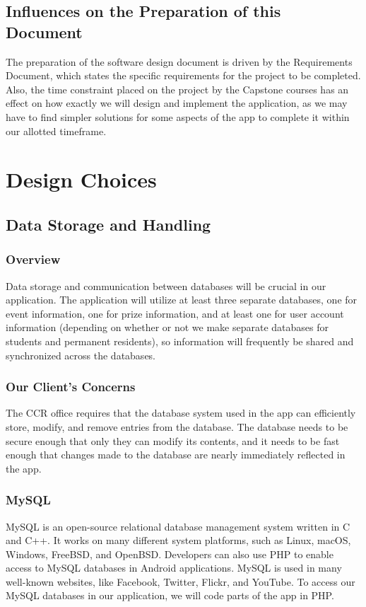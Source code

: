 \documentclass[draftclsnofoot, onecolumn, 10pt, compsoc]{IEEEtran}
\begin{document}
		\subsection{Influences on the Preparation of this Document}
			The preparation of the software design document is driven by the Requirements Document, which states the specific requirements for the project to be completed. Also, the time constraint placed on the project by the Capstone courses has an effect on how exactly we will design and implement the application, as we may have to find simpler solutions for some aspects of the app to complete it within our allotted timeframe.

	\section{Design Choices}
		\subsection{Data Storage and Handling}
			\subsubsection{Overview}
				Data storage and communication between databases will be crucial in our application. The application will utilize at least three separate databases, one for event information, one for prize information, and at least one for user account information (depending on whether or not we make separate databases for students and permanent residents), so information will frequently be shared and synchronized across the databases.
			\subsubsection{Our Client's Concerns}
				The CCR office requires that the database system used in the app can efficiently store, modify, and remove entries from the database. The database needs to be secure enough that only they can modify its contents, and it needs to be fast enough that changes made to the database are nearly immediately reflected in the app.
			\subsubsection{MySQL}
				MySQL is an open-source relational database management system written in C and C++. It works on many different system platforms, such as Linux, macOS, Windows, FreeBSD, and OpenBSD. Developers can also use PHP to enable access to MySQL databases in Android applications. MySQL is used in many well-known websites, like Facebook, Twitter, Flickr, and YouTube. To access our MySQL databases in our application, we will code parts of the app in PHP.
				~\cite{MySQL}
\end{document}

